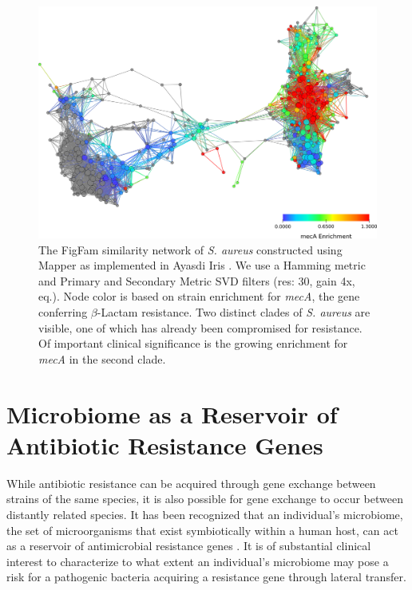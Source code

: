 \begin{figure}[t]
\centering
\includegraphics[width=\textwidth]{./fig/saureus_figfam_network.png}
\caption[FigFam similarity network of \emph{S. aureus}]{The FigFam similarity network of \emph{S. aureus} constructed using Mapper as implemented in Ayasdi Iris \cite{AyasdiIris:2015}. We use a Hamming metric and Primary and Secondary Metric SVD filters (res: 30, gain 4x, eq.). Node color is based on strain enrichment for \emph{mecA}, the gene conferring $\beta$-Lactam resistance. Two distinct clades of \emph{S. aureus} are visible, one of which has already been compromised for resistance. Of important clinical significance is the growing enrichment for \emph{mecA} in the second clade.}
\label{fig:saureus_figfam_network}
\end{figure}

\section{Microbiome as a Reservoir of Antibiotic Resistance Genes}
\label{pathogens:microbiome}

While antibiotic resistance can be acquired through gene exchange between strains of the same species, it is also possible for gene exchange to occur between distantly related species.
It has been recognized that an individual's microbiome, the set of microorganisms that exist symbiotically within a human host, can act as a reservoir of antimicrobial resistance genes \cite{Sommer:2010uh,Penders:2013wt}.
It is of substantial clinical interest to characterize to what extent an individual's microbiome may pose a risk for a pathogenic bacteria acquiring a resistance gene through lateral transfer.

